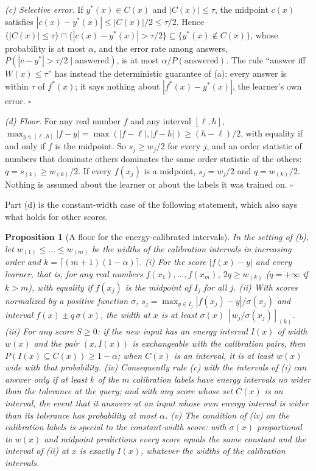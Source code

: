 \documentclass[aps,prx,onecolumn,10pt,nofootinbib,longbibliography,floatfix]{revtex4-2}
\newtheorem{proposition}{Proposition}
\theoremstyle{remark}
\begin{document}
\emph{(c) Selective error.} If $y^*(x)\in C(x)$ and $|C(x)|\le\tau$, the midpoint $c(x)$ satisfies
$|c(x)-y^*(x)|\le|C(x)|/2\le\tau/2$. Hence $\{|C(x)|\le\tau\}\cap\{|c(x)-y^*(x)|>\tau/2\}\subseteq\{y^*(x)\notin %
C(x)\}$, whose probability is at most $\alpha$, and the error rate among answers,
$P(|c-y^*|>\tau/2\mid\text{answered})$, is at most $\alpha/P(\text{answered})$. The rule ``answer iff
$W(x)\le\tau$'' has instead the deterministic guarantee of (a): every answer is within $\tau$ of $f^*(x)$; it says
nothing about $|f^*(x)-y^*(x)|$, the learner's own error. $\square$

\emph{(d) Floor.} For any real number $f$ and any interval $[\ell,h]$,
$\max_{y\in[\ell,h]}|f-y|=\max(|f-\ell|,|f-h|)\ge(h-\ell)/2$, with equality if and only if $f$ is the midpoint.
So $s_j\ge w_j/2$ for every $j$, and an order statistic of numbers that dominate others dominates the same order
statistic of the others: $q=s_{(k)}\ge w_{(k)}/2$. If every $f(x_j)$ is a midpoint, $s_j=w_j/2$ and $q=w_{(k)}/2$.
Nothing is assumed about the learner or about the labels it was trained on. $\square$

Part (d) is the constant-width case of the following statement, which also says what holds for other scores.

\begin{proposition}[A floor for the energy-calibrated intervals]
\label{prop:floor}
In the setting of (b), let $w_{(1)}\le\dots\le w_{(m)}$ be the widths of the calibration intervals in increasing
order and $k=\lceil(m+1)(1-\alpha)\rceil$.
(i) For the score $|f(x)-y|$ and every learner, that is, for any real numbers $f(x_1),\dots,f(x_m)$,
$2q\ge w_{(k)}$ ($q=+\infty$ if $k>m$), with equality if $f(x_j)$ is the midpoint of $I_j$ for all $j$.
(ii) With scores normalized by a positive function $\sigma$, $s_j=\max_{y\in I_j}|f(x_j)-y|/\sigma(x_j)$ and
interval $f(x)\pm q\,\sigma(x)$, the width at $x$ is at least $\sigma(x)\,[w_j/\sigma(x_j)]_{(k)}$.
(iii) For any score $S\ge0$: if the new input has an energy interval $I(x)$ of width $w(x)$ and the pair
$(x,I(x))$ is exchangeable with the calibration pairs, then $P(I(x)\subseteq C(x))\ge1-\alpha$; when $C(x)$
is an interval, it is at least $w(x)$ wide with that probability.
(iv) Consequently rule (c) with the intervals of (i) can answer only if at least $k$ of the $m$ calibration labels
have energy intervals no wider than the tolerance at the query; and with any score whose set $C(x)$ is an
interval, the event that it answers at an input whose own energy interval is wider than its tolerance has
probability at most $\alpha$.
(v) The condition of (iv) on the calibration labels is special to the constant-width score: with $\sigma(x)$ proportional to $w(x)$ and
midpoint predictions every score equals the same constant and the interval of (ii) at $x$ is exactly $I(x)$,
whatever the widths of the calibration intervals.
\end{proposition}
\end{document}
